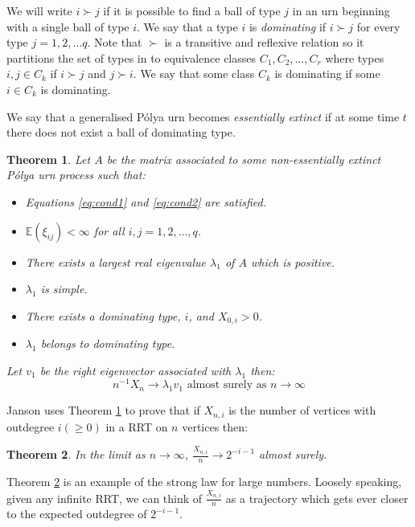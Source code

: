 \documentclass[oneside]{book} %
\newtheorem{theorem}{Theorem}
\theoremstyle{definition}
\numberwithin{equation}{section}
\begin{document}
We will write $i\succ j$ if it is possible to find a ball of type $j$ in an urn beginning with a single ball of type $i$.  We say that a type $i$ is \emph{dominating} if $i\succ j$ for every type $j = 1,2,\dots q$. Note that $\succ$ is a transitive and reflexive relation so it partitions the set of types in to equivalence classes $C_1,C_2,\dots , C_r$ where types $i,j \in C_k$ if $i\succ j$ and $j\succ i$.  We say that some class $C_k$ is dominating if some $i \in C_k$ is dominating.

We say that a generalised P\'{o}lya urn becomes \emph{essentially extinct} if at some time $t$ there does not exist a ball of dominating type.  

      

\begin{theorem}\label{thm:3.21}
 Let $A$ be the matrix associated to some non-essentially extinct P\'{o}lya urn process such that:
 \begin{itemize}
  \item[(A1)] Equations \ref{eq:cond1} and \ref{eq:cond2} are satisfied.
  \item[(A2)] $\mathbb{E}(\xi_{ij}) < \infty$ for all $i,j  = 1,2,\dots, q$.
  \item[(A3)] There exists a largest real eigenvalue $\lambda_{1}$ of $A$ which is positive.
  \item[(A4)] $\lambda_1$ is simple.
  \item[(A5)] There exists a dominating type, $i$, and $X_{0,i} > 0$.
  \item[(A6)] $\lambda_{1}$ belongs to dominating type.  
 \end{itemize}
Let $v_{1}$ be the right eigenvector associated with $\lambda_1$ then:
\[n^{-1}X_{n} \rightarrow \lambda_{1}v_{1} \text{   almost surely as   } n \rightarrow\infty\]
\end{theorem}

Janson uses Theorem \ref{thm:3.21} to prove that if $X_{n,i}$ is the number of vertices with outdegree $i(\geq 0 )$ in a RRT on $n$ vertices then:

\begin{theorem}\label{thm:3.1}
 In the limit as $n\rightarrow\infty$, $\frac{X_{n,i}}{n} \rightarrow 2^{-i-1}$ almost surely.
\end{theorem}
Theorem \ref{thm:3.1}  is an example of the strong law for large numbers.  Loosely speaking, given any infinite RRT, we can think of $\frac{X_{n,i}}{n}$ as a trajectory which gets ever closer to the expected outdegree of $2^{-i-1}$. 
\end{document}
